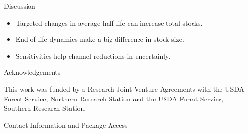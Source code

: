 \documentclass[final]{beamer}\usepackage[]{graphicx}\usepackage[]{color}
\newlength{\onecolwid}
\begin{document}
\begin{frame}[t]
\begin{columns}[t]
\begin{column}{\onecolwid}
\begin{block}{Discussion}

\begin{itemize}
\item Targeted changes in average half life can increase total stocks.
\item End of life dynamics make a big difference in stock size.
\item Sensitivities help channel reductions in uncertainty.
\end{itemize}

\end{block}





\begin{block}{Acknowledgements}

This work was funded by a Research Joint Venture Agreements with the USDA Forest Service, Northern Research Station and the USDA Forest Service, Southern Research Station.

\end{block}



\begin{alertblock}{Contact Information and Package Access}


\end{alertblock}
\end{column}
\end{columns}
\end{frame}
\end{document}
